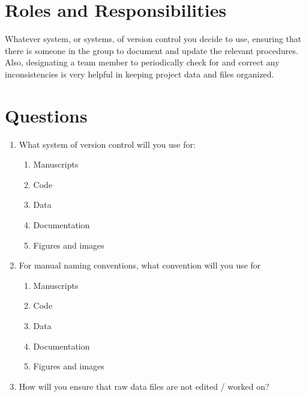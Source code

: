 \documentclass[
]{book}
\providecommand{\tightlist}{%
  \setlength{\itemsep}{0pt}\setlength{\parskip}{0pt}}
\begin{document}
\hypertarget{roles-and-responsibilities-2}{%
\section*{Roles and Responsibilities}\label{roles-and-responsibilities-2}}

Whatever system, or systems, of version control you decide to use, ensuring that there is someone in the group to document and update the relevant procedures. Also, designating a team member to periodically check for and correct any inconsistencies is very helpful in keeping project data and files organized.

\hypertarget{questions-3}{%
\section*{Questions}\label{questions-3}}

\begin{enumerate}
\def\labelenumi{\arabic{enumi}.}
\tightlist
\item
  What system of version control will you use for:

  \begin{enumerate}
  \def\labelenumii{\alph{enumii}.}
  \tightlist
  \item
    Manuscripts
  \item
    Code
  \item
    Data
  \item
    Documentation
  \item
    Figures and images
  \end{enumerate}
\item
  For manual naming conventions, what convention will you use for

  \begin{enumerate}
  \def\labelenumii{\alph{enumii}.}
  \tightlist
  \item
    Manuscripts
  \item
    Code
  \item
    Data
  \item
    Documentation
  \item
    Figures and images
  \end{enumerate}
\item
  How will you ensure that raw data files are not edited / worked on?
\end{enumerate}
\end{document}
